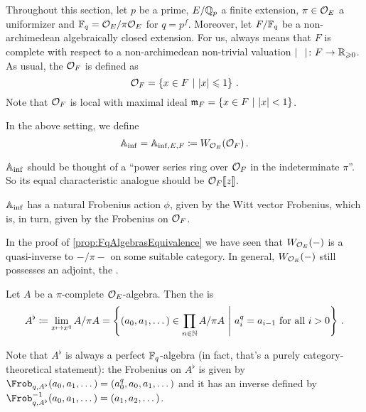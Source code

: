 Throughout this section, let $p$ be a prime, $E/\mathbb{Q}_p$ a finite extension, $\pi\in \mathcal{O}_E$ a uniformizer and $\mathbb{F}_q=\mathcal{O}_E/\pi\mathcal{O}_E$ for $q=p^f$. Moreover, let $F/\mathbb{F}_q$ be a non-archimedean algebraically closed extension. For us,  always means that $F$ is complete with respect to a non-archimedean non-trivial valuation $|\blank|\colon F\morphism\IR_{\geq 0}$. As usual, the  $\mathcal{O}_F$ is defined as
\begin{equation*}
	\mathcal{O}_F=\left\{x\in F\ \middle|\  |x|\leqslant 1\right\}\,.
\end{equation*}
Note that $\mathcal{O}_F$ is local with maximal ideal $\mathfrak{m}_F=\left\{x\in F\ \middle|\ |x|<1\right\}$.
\begin{defi}
	In the above setting, we define
	\begin{equation*}
		\mathbb{A}_{\mathrm{inf}}=\mathbb{A}_{\mathrm{inf},E,F}\coloneqq W_{\mathcal{O}_E}(\mathcal{O}_F)\,.
	\end{equation*}
\end{defi}
\begin{rem}
	\begin{numerate}
		\item $\mathbb{A}_{\mathrm{inf}}$ should be thought of a \enquote{power series ring over $\mathcal{O}_F$ in the indeterminate $\pi$}. So its equal characteristic analogue should be $\mathcal{O}_F\llbracket z\rrbracket$.
		\item $\mathbb{A}_{\mathrm{inf}}$ has a natural Frobenius action $\phi$, given by the Witt vector Frobenius, which is, in turn, given by the Frobenius on $\mathcal{O}_F$.
	\end{numerate}
\end{rem}
In the proof of \cref{prop:FqAlgebrasEquivalence} we have seen that $W_{\mathcal{O}_E}(-)$ is a quasi-inverse to $-/\pi -$ on some suitable category. In general, $W_{\mathcal{O}_E}(-)$ still possesses an adjoint, the .
\begin{defi}
	Let $A$ be a $\pi$-complete $\mathcal{O}_E$-algebra. Then the  is
	\begin{equation*}
		A^\flat\coloneqq \lim_{x\mapsto x^q}A/\pi A=\left\{(a_0,a_1,\dotsc)\in\prod_{n\in\mathbb{N}}A/\pi A\ \middle|\  a_i^q=a_{i-1}\text{ for all }i>0\right\}\,.
	\end{equation*}
\end{defi}
Note that $A^\flat$ is always a perfect $\mathbb{F}_q$-algebra (in fact, that's a purely category-theoretical statement): the Frobenius on $A^\flat$ is given by $\Frob_{q,A^\flat}(a_0,a_1,\dotsc)=(a_0^q,a_0,a_1,\dotsc)$ and it has an inverse defined by $\Frob_{q,A^\flat}^{-1}(a_0,a_1,\dotsc)=(a_1,a_2,\dotsc)$.
